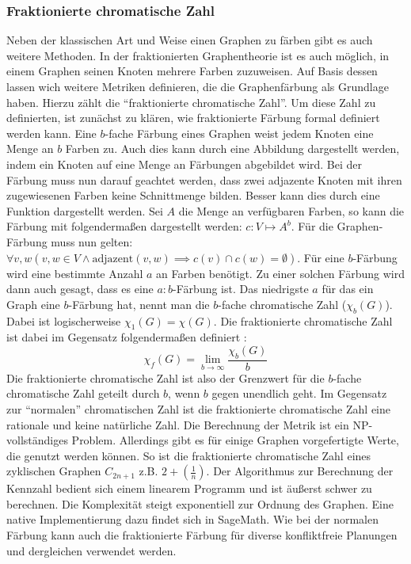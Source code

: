 \documentclass[a4paper,12pt,ngerman,chapterprefix=false,listof=totoc,bibliography=totoc]{scrreprt}
\begin{document}
\subsubsection*{Fraktionierte chromatische Zahl}
{
Neben der klassischen Art und Weise einen Graphen zu färben gibt es auch weitere Methoden. In der fraktionierten Graphentheorie ist es auch möglich, in einem Graphen seinen Knoten mehrere Farben zuzuweisen. Auf Basis dessen lassen wich weitere Metriken definieren, die die Graphenfärbung als Grundlage haben. Hierzu zählt die "`fraktionierte chromatische Zahl"'. Um diese Zahl zu definierten, ist zunächst zu klären, wie fraktionierte Färbung formal definiert werden kann. Eine \(b\)-fache Färbung eines Graphen weist jedem Knoten eine Menge an \(b\) Farben zu. Auch dies kann durch eine Abbildung dargestellt werden, indem ein Knoten auf eine Menge an Färbungen abgebildet wird. Bei der Färbung muss nun darauf geachtet werden, dass zwei adjazente Knoten mit ihren zugewiesenen Farben keine Schnittmenge bilden. Besser kann dies durch eine Funktion dargestellt werden. Sei \(A\) die Menge an verfügbaren Farben, so kann die Färbung mit folgendermaßen dargestellt werden: \(c: V\mapsto A^b\). Für die Graphen-Färbung muss nun gelten: \(\forall v,w(v,w\in V\land \text{adjazent}(v,w)\implies c(v)\cap c(w)=\emptyset)\). Für eine \(b\)-Färbung wird eine bestimmte Anzahl \(a\) an Farben benötigt. Zu einer solchen Färbung wird dann auch gesagt, dass es eine \(a:b\)-Färbung ist. Das niedrigste \(a\) für das ein Graph eine \(b\)-Färbung hat, nennt man die \(b\)-fache chromatische Zahl (\(\chi _b(G)\)). Dabei ist logischerweise \(\chi_1(G) = \chi (G)\). Die fraktionierte chromatische Zahl ist dabei im Gegensatz folgendermaßen definiert \cite{scheinerman_fractional_2011}:
\[\chi_f(G)=\lim_{b\to\infty}\frac{\chi_b(G)}{b}\]
Die fraktionierte chromatische Zahl ist also der Grenzwert für die \(b\)-fache chromatische Zahl geteilt durch \(b\), wenn \(b\) gegen unendlich geht. Im Gegensatz zur "`normalen"' chromatischen Zahl ist die fraktionierte chromatische Zahl eine rationale und keine natürliche Zahl. Die Berechnung der Metrik ist ein NP-vollständiges Problem. Allerdings gibt es für einige Graphen vorgefertigte Werte, die genutzt werden können. So ist die fraktionierte chromatische Zahl eines zyklischen Graphen \(C_{2n+1}\) z.B. \(2+(\frac{1}{n})\). Der Algorithmus zur Berechnung der Kennzahl bedient sich einem linearem Programm und ist äußerst schwer zu berechnen. Die Komplexität steigt exponentiell zur Ordnung des Graphen. Eine native Implementierung dazu findet sich in SageMath. Wie bei der normalen Färbung kann auch die fraktionierte Färbung für diverse konfliktfreie Planungen und dergleichen verwendet werden. \cite{weisstein_chromatic_nodate,sagemath_graph_2020-1,scheinerman_fractional_2011}
}
\end{document}
